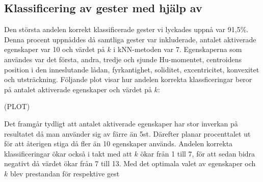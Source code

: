 \documentclass[../rapport_MVEX01-11-05]{subfiles}
\begin{document}
\subsection{Klassificering av gester med hjälp av \knn}

Den största andelen korrekt klassificerade gester vi lyckades uppnå var 91,5\%.
Denna procent uppnåddes då samtliga gester var inkluderade, antalet aktiverade
egenskaper var 10 och värdet på $k$ i kNN-metoden var 7. Egenskaperna som
användes var det första, andra, tredje och sjunde Hu-momentet, centroidens
position i den inneslutande lådan, fyrkantighet, soliditet, excentricitet,
konvexitet och utsträckning. Följande plot visar hur andelen korrekta
klassficeringar beror på antalet aktiverade egenskaper och värdet på $k$:

(PLOT)

Det framgår tydligt att antalet aktiverade egenskaper har stor inverkan på
resultatet då man använder sig av färre än 5st. Därefter planar procenttalet ut
för att återigen stiga då fler än 10 egenskaper används. Andelen korrekta
klassificeringar ökar också i takt med att $k$ ökar från 1 till 7, för att sedan
bidra negativt då värdet ökar från 7 till 13. Med det optimala valet av
egenskaper och $k$ blev prestandan för respektive gest
\end{document}

